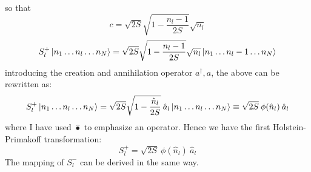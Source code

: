 \documentclass[11pt]{article}
\theoremstyle{remark}
\theoremstyle{definition}
\numberwithin{thm}{section}
\numberwithin{equation}{section}
\begin{document}
so that
\begin{equation}
	c = \sqrt{2S}\sqrt{1 - \frac{n_l - 1}{2S}}\sqrt{n_l}
\end{equation}
\begin{equation}
	S_l^+ \ket{n_1\ldots n_l\ldots n_N} = \sqrt{2S}\sqrt{1 - \frac{n_l - 1}{2S}}\sqrt{n_l}\ket{n_1\ldots n_l - 1\ldots n_N}
\end{equation}
introducing the creation and annihilation operator $a^\dagger, a$, the above can be rewritten as:
\begin{equation}
	S_l^+ \ket{n_1\ldots n_l\ldots n_N} = \sqrt{2S}\sqrt{1 - \frac{\hat{n}_l}{2S}}\:\hat{a}_l\ket{n_1\ldots n_l\ldots n_N} \equiv \sqrt{2S}\:\phi(\hat{n}_l) \:\hat{a}_l
\end{equation}
where I have used $\hat{\bullet}$ to emphasize an operator. Hence we have the first Holstein-Primakoff transformation:
\begin{equation}
	S_l^+ = \sqrt{2S}\:\phi(\hat{n}_l) \:\hat{a}_l
\end{equation}
The mapping of $S_l^-$ can be derived in the same way. 
\end{document}
